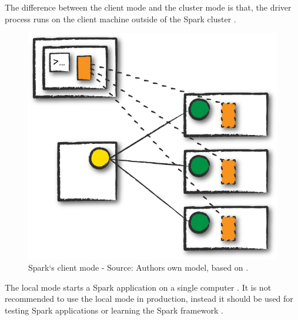 The difference between the client mode and the cluster mode is that, the driver process runs on the client machine outside of the Spark cluster \cite{Chambers2018Spark}.
\begin{figure}[h]%
\centering
\includegraphics[scale=0.5]{images/04_technical_background/client_mode}%
\caption{Spark`s client mode - Source: Authors own model, based on \cite{Chambers2018Spark}.}%
\label{fig:spark_client_mode}%
\end{figure}

The local mode starts a Spark application on a single computer \cite{Chambers2018Spark}. It is not recommended to use the local mode in production, instead it should be used for testing Spark applications or learning the Spark framework \cite{Chambers2018Spark}.


